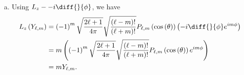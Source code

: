 \documentclass[10pt]{mypackage}
\begin{document}
\begin{solution}[35.21]\hfill
  \begin{enumerate}[(a)]
    \item Using $L_{z} - -i\diff{}{\phi}$, we have
      \begin{align*}
        L_z\left( Y_{\ell,m} \right) &= \left( -1 \right)^{m}\sqrt{\frac{2\ell + 1}{4\pi}}\sqrt{\frac{\left( \ell - m \right)!}{\left( \ell + m \right)!}}P_{\ell,m}\left( \cos\left( \theta \right) \right) \left( -i\diff{}{\phi}e^{im\phi} \right)\\
                                     &= m\left( \left( -1 \right)^{m}\sqrt{\frac{2\ell + 1}{4\pi}}\sqrt{\frac{\left( \ell - m \right)!}{\left( \ell + m \right)!}} P_{\ell,m}\left( \cos\left( \theta \right) \right)e^{im\phi} \right)\\
                                     &= mY_{\ell,m}.
      \end{align*}
  \end{enumerate}
\end{solution}
\begin{solution}[35.25]

\end{solution}
\end{document}
